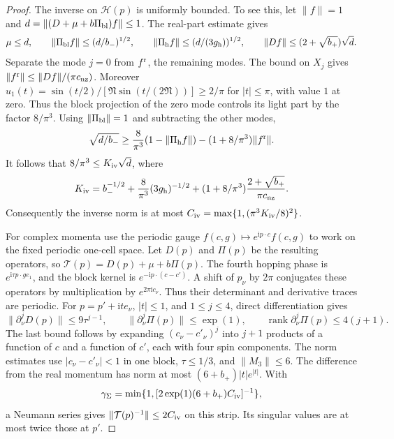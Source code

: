\begin{proof}
The inverse on $\mathcal H(p)$ is uniformly bounded.
To see this, let $\|f\|=1$ and
$d=\|(D+\mu+b\Pi_{\rm bl})f\|\le1$.
The real-part estimate gives
\[
 \mu\le d,\qquad
 \|\Pi_{\rm bl}f\|\le(d/b_-)^{1/2},\qquad
 \|\Pi_{\rm h}f\|\le(d/(3g_{\rm h}))^{1/2},
 \qquad \|Df\|\le(2+\sqrt{b_+})\sqrt d.
\]
Separate the mode $j=0$ from $f^{\rm r}$, the remaining
modes. The bound on $X_j$ gives
$\|f^{\rm r}\|\le\|Df\|/(\pi c_{\rm nz})$.
Moreover
$u_1(t)=\sin(t/2)/[\mathfrak N\sin(t/(2\mathfrak N))]
\ge2/\pi$ for $|t|\le\pi$, with value $1$ at zero.
Thus the block projection of the zero mode controls
its light part by the factor $8/\pi^3$.
Using $\|\Pi_{\rm bl}\|=1$ and subtracting the other modes,
\[
 \sqrt{d/b_-}\ge
 \frac8{\pi^3}(1-\|\Pi_{\rm h}f\|)
                     -(1+8/\pi^3)\|f^{\rm r}\|.
\]
It follows that $8/\pi^3\le K_{\rm iv}\sqrt d$, where
\[
 K_{\rm iv}=b_-^{-1/2}+\frac8{\pi^3}(3g_{\rm h})^{-1/2}
       +(1+8/\pi^3)\frac{2+\sqrt{b_+}}{\pi c_{\rm nz}}.
\]
Consequently the inverse norm is at most
$C_{\rm iv}=\max\{1,(\pi^3K_{\rm iv}/8)^2\}$.

For complex momenta use the periodic gauge
$f(c,g)\mapsto e^{\mathrm ip\cdot c}f(c,g)$ to work
on the fixed periodic one-cell space. Let $D(p)$
and $\Pi(p)$ be the resulting operators, so
$\mathcal T(p)=D(p)+\mu+b\Pi(p)$.
The fourth hopping phase is
$e^{\mathrm i\tau p\cdot ge_1}$, and the block kernel is
$e^{-\mathrm ip\cdot(c-c')}$. A shift of $p_\nu$
by $2\pi$ conjugates these operators by multiplication
by $e^{2\pi\mathrm ic_\nu}$.
Thus their determinant and derivative traces are periodic.
For $p=p'+\mathrm it e_\nu$, $|t|\le1$, and $1\le j\le4$,
direct differentiation gives
\begin{equation}\label{eq:term-Bloch-derivatives}
 \|\partial_\nu^jD(p)\|\le9\tau^{j-1},\qquad
 \|\partial_\nu^j\Pi(p)\|\le\exp(1),\qquad
 \operatorname{rank}\partial_\nu^j\Pi(p)\le4(j+1).
\end{equation}
The last bound follows by expanding $(c_\nu-c'_\nu)^j$
into $j+1$ products of a function of $c$ and a function
of $c'$, each with four spin components.
The norm estimates use $|c_\nu-c'_\nu|<1$ in one block,
$\tau\le1/3$, and $\|M_3\|\le6$.
The difference from the real momentum has norm at most
$(6+b_+)|t|e^{|t|}$. With
\[
 \gamma_\Sigma=
 \min\{1,[2\exp(1)(6+b_+)C_{\rm iv}]^{-1}\},
\]
a Neumann series gives
$\|\mathcal T(p)^{-1}\|\le2C_{\rm iv}$ on this strip.
Its singular values are at most twice those at $p'$.


\end{proof}
